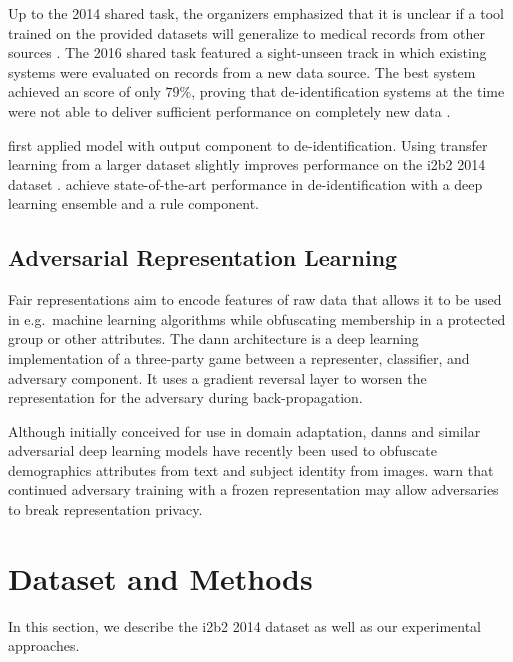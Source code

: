 %
Up to the 2014 shared task, the organizers emphasized that it is unclear if a tool trained on the provided datasets will generalize to medical records from other sources \citep{uzuner2007evaluating,stubbs2015automated}.
%
The 2016 shared task featured a sight-unseen track in which existing systems were evaluated on records from a new data source.
%
The best system achieved an \fone score of only $79\%$, proving that de-identification systems at the time were not able to deliver sufficient performance on completely new data \citep{stubbs2017identification}.

%
\citet{dernoncourt2017identification} first applied  \citep{hochreiter1997long} model with  output component to de-identification.
%
Using transfer learning from a larger dataset slightly improves performance on the i2b2 2014 dataset \citep{lee2017transfer}.
%
\citet{liu2017identification} achieve state-of-the-art performance in de-identification with a deep learning ensemble and a rule component.

\subsection{Adversarial Representation Learning}
%
Fair representations \citep{zemel2013learning,hamm2015preserving} aim to encode features of raw data that allows it to be used in e.g.\ machine learning algorithms while obfuscating membership in a protected group or other attributes.
%
The \ac{dann} architecture \citep{ganin2016domain} is a deep learning implementation of a three-party game between a representer, classifier, and adversary component.
%
It uses a gradient reversal layer to worsen the representation for the adversary during back-propagation.

%
Although initially conceived for use in domain adaptation, \acp{dann} and similar adversarial deep learning models have recently been used to obfuscate demographics attributes \citep{elazar2018adversarial,li2018towards} from text and subject identity \citep{feutry2018learning} from images.
%
\citet{elazar2018adversarial} warn that continued adversary training with a frozen representation may allow adversaries to break representation privacy.

\section{Dataset and Methods}
%
In this section, we describe the i2b2 2014 dataset as well as our experimental approaches.

